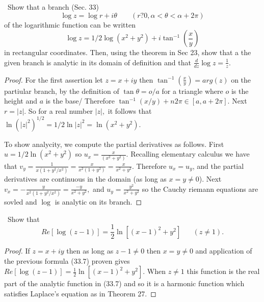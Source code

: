 \documentclass[11pt]{amsart}
\theoremstyle{definition}
\numberwithin{theorem}{section}
\numberwithin{definition}{section}
\numberwithin{equation}{section}
\begin{document}
\medskip {}\ Show that a branch (Sec. 33)
\begin{equation*}
	\log z = \log r + i \theta \;\;\;\;\;\;\;(r ? 0, \alpha < \theta < \alpha + 2\pi)
\end{equation*}
of the logarithmic function can be written $$\log z = 1/2 \log (x^2 + y^2) + i \tan^{-1}\left(\frac{x}{y}\right)$$
in rectangular coordinates. Then, using the theorem in Sec 23, show that a the given branch is analytic in its domain of definition and that $\frac{d}{dz} \log z = \frac{1}{z}.$
\begin{proof}
	For the first assertion let $z = x + iy$ then $\tan^{-1}\left(\frac{x}{y}\right) = arg(z)$ on the partiular branch,
	by the definition of $\tan \theta = o/a$ for a triangle where $o$ is the height and $a$ is the base/ Therefore 
	$\tan^{-1}(x/y) + n2\pi \in [a, a+2\pi]$. Next $r = |z|.$ So for a real number $|z|,$ it follows that $\ln (|z|^2)^{1/2} = 1/2 \ln |z|^2 = \ln(x^2 + y^2).$

	To show analycity, we compute the partial derivatives as follows. First $u = 1/2 \ln(x^2 + y^2)$ so $u_x = \frac{x}{(x^2 + y^2)}.$ Recalling elementary calculus we have that $v_y = \frac{1}{x(1 + y^2/x^2)} = \frac{x}{x^2(1 + y^2)} = \frac{x}{x^2 + y^2}$. Therefore $u_x = u_y$, and the partial derivatives are continuous in the domain (as long as $x=y \neq 0$).
	Next $v_x = -\frac{y}{x^2(1 + y^2/x^2)} = \frac{-y}{x^2 + y^2}, $ and $u_y = \frac{y^2}{x^2 + y^2}$ so the Cauchy riemann equations are sovled and $\log$ is analytic on its branch.
\end{proof}

\medskip {}\ Show that 
\begin{equation*}
	Re[\log(z-1)] = \frac{1}{2}\ln[(x-1)^2 + y^2]\;\;\;\;\;\;(z\neq 1).
\end{equation*}
\begin{proof}
If $z = x + iy$ then as long as $z -1 \neq 0$ then $x = y \neq 0$ and application of the previous formula (33.7) proven gives $Re[\log(z-1)] = \frac{1}{2}\ln[(x-1)^2 + y^2].$ When $z \neq 1$ this function is the real part of the analytic function in (33.7) and so it is a harmonic function which satisfies Laplace's equation as in Theorem 27.
	
\end{proof}
\end{document}
